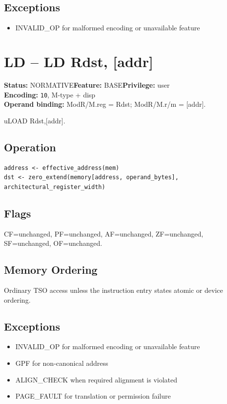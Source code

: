 \documentclass[10pt]{article}
\begin{document}
\subsection*{Exceptions}
\begin{itemize}
\item INVALID\_OP for malformed encoding or unavailable feature
\end{itemize}
\clearpage

\section{LD -- LD Rdst, [addr]}
\textbf{Status:} NORMATIVE\quad \textbf{Feature:} BASE\quad \textbf{Privilege:} user\\
\textbf{Encoding:} \texttt{10}, M-type + disp\\
\textbf{Operand binding:} ModR/M.reg = Rdst; ModR/M.r/m = [addr].

uLOAD Rdst,[addr].

\subsection*{Operation}
\begin{lstlisting}
address <- effective_address(mem)
dst <- zero_extend(memory[address, operand_bytes], architectural_register_width)
\end{lstlisting}
\subsection*{Flags}
CF=unchanged, PF=unchanged, AF=unchanged, ZF=unchanged, SF=unchanged, OF=unchanged.
\subsection*{Memory Ordering}
Ordinary TSO access unless the instruction entry states atomic or device ordering.
\subsection*{Exceptions}
\begin{itemize}
\item INVALID\_OP for malformed encoding or unavailable feature
\item GPF for non-canonical address
\item ALIGN\_CHECK when required alignment is violated
\item PAGE\_FAULT for translation or permission failure
\end{itemize}
\clearpage
\end{document}
